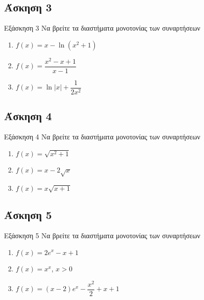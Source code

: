 \documentclass[greek]{beamer}
\begin{document}
\subsection{Άσκηση 3}
\begin{frame}[label=Άσκηση3]{Εξάσκηση 3}
  Να βρείτε τα διαστήματα μονοτονίας των συναρτήσεων
  \begin{enumerate}
    \item<1-> $f(x)=x-\ln (x^2+1)$
    \item<2-> $f(x)=\dfrac{x^2-x+1}{x-1}$
    \item<3-> $f(x)=\ln |x|+\dfrac{1}{2x^2}$
  \end{enumerate}

\end{frame}

\subsection{Άσκηση 4}
\begin{frame}[label=Άσκηση4]{Εξάσκηση 4}
  Να βρείτε τα διαστήματα μονοτονίας των συναρτήσεων
  \begin{enumerate}
    \item<1-> $f(x)=\sqrt{x^2+1}$
    \item<2-> $f(x)=x-2\sqrt{x}$
    \item<3-> $f(x)=x\sqrt{x+1}$
  \end{enumerate}

\end{frame}

\subsection{Άσκηση 5}
\begin{frame}[label=Άσκηση5]{Εξάσκηση 5}
  Να βρείτε τα διαστήματα μονοτονίας των συναρτήσεων
  \begin{enumerate}
    \item<1-> $f(x)=2e^x-x+1$
    \item<2-> $f(x)=x^x$, $x>0$
    \item<3-> $f(x)=(x-2)e^x-\dfrac{x^2}{2}+x+1$
  \end{enumerate}

\end{frame}
\end{document}
